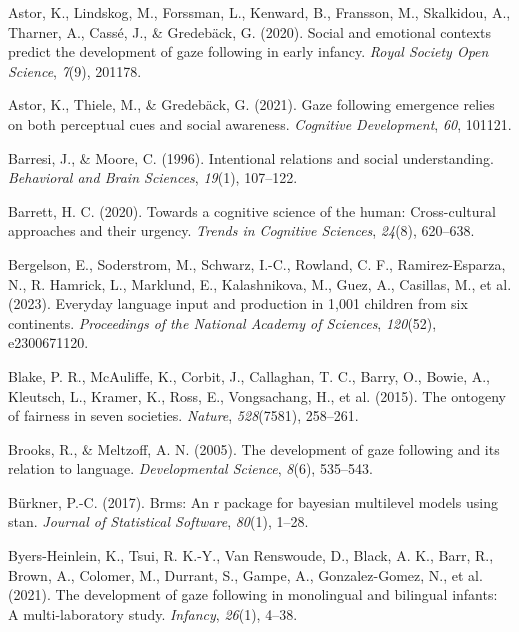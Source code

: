 \documentclass[
  man,floatsintext]{apa7}
\newlength{\cslhangindent}
\newenvironment{CSLReferences}[2] %
 {\begin{list}{}{%
  \setlength{\itemindent}{0pt}
  \setlength{\leftmargin}{0pt}
  \setlength{\parsep}{0pt}
  \ifodd #1
   \setlength{\leftmargin}{\cslhangindent}
   \setlength{\itemindent}{-1\cslhangindent}
  \fi
  \setlength{\itemsep}{#2\baselineskip}}}
 {\end{list}}
\begin{document}
\label{refs}
\begin{CSLReferences}{1}{0}
Astor, K., Lindskog, M., Forssman, L., Kenward, B., Fransson, M., Skalkidou, A., Tharner, A., Cassé, J., \& Gredebäck, G. (2020). Social and emotional contexts predict the development of gaze following in early infancy. \emph{Royal Society Open Science}, \emph{7}(9), 201178.

Astor, K., Thiele, M., \& Gredebäck, G. (2021). Gaze following emergence relies on both perceptual cues and social awareness. \emph{Cognitive Development}, \emph{60}, 101121.

Barresi, J., \& Moore, C. (1996). Intentional relations and social understanding. \emph{Behavioral and Brain Sciences}, \emph{19}(1), 107--122.

Barrett, H. C. (2020). Towards a cognitive science of the human: Cross-cultural approaches and their urgency. \emph{Trends in Cognitive Sciences}, \emph{24}(8), 620--638.

Bergelson, E., Soderstrom, M., Schwarz, I.-C., Rowland, C. F., Ramirez-Esparza, N., R. Hamrick, L., Marklund, E., Kalashnikova, M., Guez, A., Casillas, M., et al. (2023). Everyday language input and production in 1,001 children from six continents. \emph{Proceedings of the National Academy of Sciences}, \emph{120}(52), e2300671120.

Blake, P. R., McAuliffe, K., Corbit, J., Callaghan, T. C., Barry, O., Bowie, A., Kleutsch, L., Kramer, K., Ross, E., Vongsachang, H., et al. (2015). The ontogeny of fairness in seven societies. \emph{Nature}, \emph{528}(7581), 258--261.

Brooks, R., \& Meltzoff, A. N. (2005). The development of gaze following and its relation to language. \emph{Developmental Science}, \emph{8}(6), 535--543.

Bürkner, P.-C. (2017). Brms: An r package for bayesian multilevel models using stan. \emph{Journal of Statistical Software}, \emph{80}(1), 1--28.

Byers-Heinlein, K., Tsui, R. K.-Y., Van Renswoude, D., Black, A. K., Barr, R., Brown, A., Colomer, M., Durrant, S., Gampe, A., Gonzalez-Gomez, N., et al. (2021). The development of gaze following in monolingual and bilingual infants: A multi-laboratory study. \emph{Infancy}, \emph{26}(1), 4--38.


\end{CSLReferences}
\end{document}
